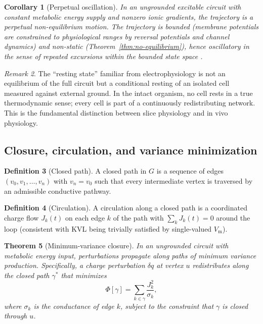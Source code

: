 \documentclass[11pt,twocolumn,a4paper]{article}
\newtheorem{theorem}{Theorem}[section]
\newtheorem{corollary}[theorem]{Corollary}
\theoremstyle{definition}
\newtheorem{definition}[theorem]{Definition}
\theoremstyle{remark}
\newtheorem{remark}[theorem]{Remark}
\newcommand{\Vm}{V_{\mathrm{m}}}
\begin{document}
\begin{corollary}[Perpetual oscillation]
\label{cor:perpetual}
In an ungrounded excitable circuit with constant metabolic energy
supply and nonzero ionic gradients, the trajectory is a perpetual
non-equilibrium motion. The trajectory is bounded (membrane potentials
are constrained to physiological ranges by reversal potentials and
channel dynamics) and non-static (Theorem~\ref{thm:no-equilibrium}),
hence oscillatory in the sense of repeated excursions within the
bounded state space \citep{nicolis1977,haken1983,prigogine1977}.
\end{corollary}

\begin{remark}
The ``resting state'' familiar from electrophysiology is not an
equilibrium of the full circuit but a conditional resting of an
isolated cell measured against external ground. In the intact
organism, no cell rests in a true thermodynamic sense; every cell is
part of a continuously redistributing network. This is the fundamental
distinction between slice physiology and in vivo physiology.
\end{remark}

\subsection{Closure, circulation, and variance minimization}

\begin{definition}[Closed path]
A closed path in $G$ is a sequence of edges $(v_0, v_1, \ldots, v_n)$
with $v_n = v_0$ such that every intermediate vertex is traversed by
an admissible conductive pathway.
\end{definition}

\begin{definition}[Circulation]
A circulation along a closed path is a coordinated charge flow
$J_k(t)$ on each edge $k$ of the path with $\sum_k J_k(t) = 0$
around the loop (consistent with KVL being trivially satisfied by
single-valued $\Vm$).
\end{definition}

\begin{theorem}[Minimum-variance closure]
\label{thm:min-variance}
In an ungrounded circuit with metabolic energy input, perturbations
propagate along paths of minimum variance production. Specifically, a
charge perturbation $\delta q$ at vertex $u$ redistributes along the
closed path $\gamma^*$ that minimizes
\begin{equation}
\Phi[\gamma] = \sum_{k \in \gamma} \frac{J_k^2}{\sigma_k},
\label{eq:variance-functional}
\end{equation}
where $\sigma_k$ is the conductance of edge $k$, subject to the
constraint that $\gamma$ is closed through $u$.
\end{theorem}
\end{document}
